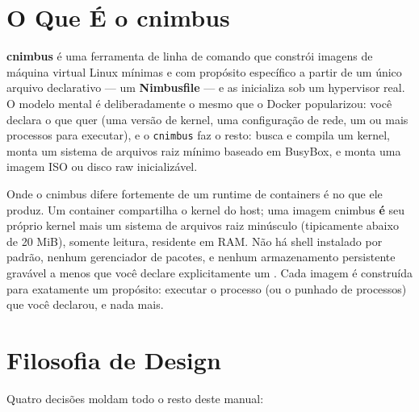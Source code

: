 \documentclass[11pt,letterpaper]{report}
\newcommand{\dashfix}[1]{\StrSubstitute{#1}{--}{-{}-}}
\newcommand{\dir}[1]{\texttt{\textbf{\dashfix{#1}}}}
\begin{document}
\section{O Que É o cnimbus}

\textbf{cnimbus} é uma ferramenta de linha de comando que constrói
imagens de máquina virtual Linux mínimas e com propósito específico a
partir de um único arquivo declarativo --- um \textbf{Nimbusfile} ---
e as inicializa sob um hypervisor real. O modelo mental é
deliberadamente o mesmo que o Docker popularizou: você declara o que
quer (uma versão de kernel, uma configuração de rede, um ou mais
processos para executar), e o \texttt{cnimbus} faz o resto: busca e
compila um kernel, monta um sistema de arquivos raiz mínimo baseado em
BusyBox, e monta uma imagem ISO ou disco raw inicializável.

Onde o cnimbus difere fortemente de um runtime de containers é no que
ele produz. Um container compartilha o kernel do host; uma imagem
cnimbus \textbf{é} seu próprio kernel mais um sistema de arquivos raiz
minúsculo (tipicamente abaixo de 20 MiB), somente leitura, residente em
RAM. Não há shell instalado por padrão, nenhum gerenciador de pacotes,
e nenhum armazenamento persistente gravável a menos que você declare
explicitamente um \dir{VOLUME}. Cada imagem é construída para exatamente
um propósito: executar o processo (ou o punhado de processos) que você
declarou, e nada mais.

\section{Filosofia de Design}

Quatro decisões moldam todo o resto deste manual:
\end{document}

